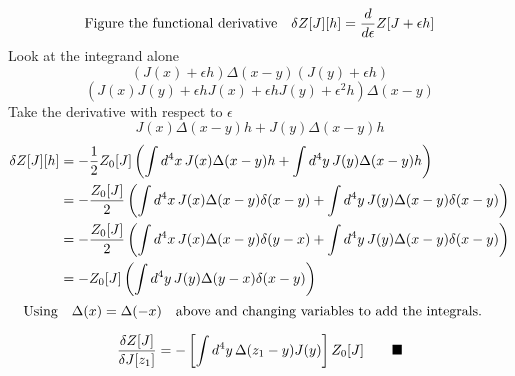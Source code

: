 \documentclass{memoir}
\begin{document}
\[\qq*{Figure the functional derivative}\var Z[J][h]=\dv{\epsilon}Z[J+\epsilon h]\]
Look at the integrand alone
\[(J(x)+\epsilon h) \Delta(x-y) (J(y)+\epsilon h)\]
\[(J(x)J(y)+\epsilon h J(x)+\epsilon h J(y)+\epsilon^2 h) \Delta(x-y)\]
Take the derivative with respect to $\epsilon$
\[J(x) \Delta(x-y)h + J(y) \Delta(x-y)h\]
\begin{align*}
    \var{ Z[J][h]} & =-\frac{1}{2}Z_0[J]\left(\int d^4 x\,  J(x) \Delta(x-y)h +\int d^4 y\,J(y) \Delta(x-y)h\right)                    \\
                   & =-\frac{Z_0[J]}{2}\left(\int d^4 x\,  J(x) \Delta(x-y)\delta(x-y) +\int d^4 y\,J(y) \Delta(x-y)\delta(x-y)\right) \\
                   & =-\frac{Z_0[J]}{2}\left(\int d^4 x\,  J(x) \Delta(x-y)\delta(y-x) +\int d^4 y\,J(y) \Delta(x-y)\delta(x-y)\right) \\
                   & =-Z_0[J]\left(\int d^4 y\,J(y) \Delta(y-x)\delta(x-y)\right)                                                      \\
\end{align*}
\[\qq*{Using}\Delta(x)=\Delta(-x)\qq{above and changing variables to add the integrals.}\]

\[\fdv{Z[J]}{J[z_1]}=-\left[\int d^4 y\, \Delta(z_1-y)J(y)\right]Z_0[J] \qquad \blacksquare\]
\end{document}
